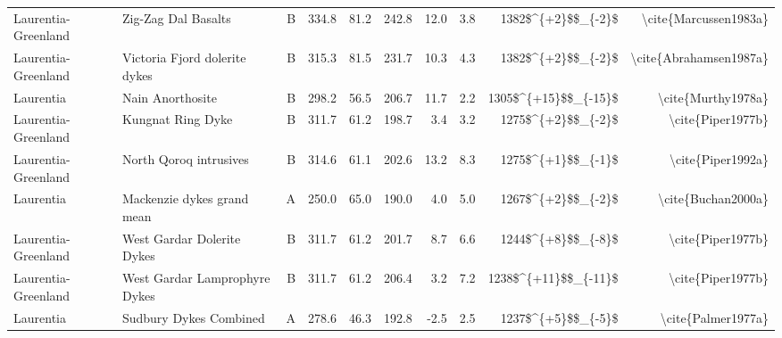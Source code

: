\begin{longtable}{p{1 in}p{1 in}rrrrrrrr}
           Laurentia-Greenland &                              Zig-Zag Dal Basalts &      B &     334.8 &      81.2 & 242.8 &  12.0 &       3.8 &     1382\$\textasciicircum \{+2\}\$\$\_\{-2\}\$ &                              \textbackslash cite\{Marcussen1983a\} \\
           Laurentia-Greenland &                    Victoria Fjord dolerite dykes &      B &     315.3 &      81.5 & 231.7 &  10.3 &       4.3 &     1382\$\textasciicircum \{+2\}\$\$\_\{-2\}\$ &                             \textbackslash cite\{Abrahamsen1987a\} \\
                     Laurentia &                                 Nain Anorthosite &      B &     298.2 &      56.5 & 206.7 &  11.7 &       2.2 &   1305\$\textasciicircum \{+15\}\$\$\_\{-15\}\$ &                                 \textbackslash cite\{Murthy1978a\} \\
           Laurentia-Greenland &                                Kungnat Ring Dyke &      B &     311.7 &      61.2 & 198.7 &   3.4 &       3.2 &     1275\$\textasciicircum \{+2\}\$\$\_\{-2\}\$ &                                  \textbackslash cite\{Piper1977b\} \\
           Laurentia-Greenland &                           North Qoroq intrusives &      B &     314.6 &      61.1 & 202.6 &  13.2 &       8.3 &     1275\$\textasciicircum \{+1\}\$\$\_\{-1\}\$ &                                  \textbackslash cite\{Piper1992a\} \\
                     Laurentia &                       Mackenzie dykes grand mean &      A &     250.0 &      65.0 & 190.0 &   4.0 &       5.0 &     1267\$\textasciicircum \{+2\}\$\$\_\{-2\}\$ &                                 \textbackslash cite\{Buchan2000a\} \\
           Laurentia-Greenland &                       West Gardar Dolerite Dykes &      B &     311.7 &      61.2 & 201.7 &   8.7 &       6.6 &     1244\$\textasciicircum \{+8\}\$\$\_\{-8\}\$ &                                  \textbackslash cite\{Piper1977b\} \\
           Laurentia-Greenland &                    West Gardar Lamprophyre Dykes &      B &     311.7 &      61.2 & 206.4 &   3.2 &       7.2 &   1238\$\textasciicircum \{+11\}\$\$\_\{-11\}\$ &                                  \textbackslash cite\{Piper1977b\} \\
                     Laurentia &                           Sudbury Dykes Combined &      A &     278.6 &      46.3 & 192.8 &  -2.5 &       2.5 &     1237\$\textasciicircum \{+5\}\$\$\_\{-5\}\$ &                                 \textbackslash cite\{Palmer1977a\} \\

\end{longtable}
